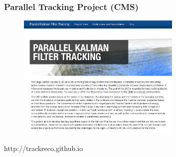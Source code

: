 \begin{frame}
\frametitle{Parallel Tracking Project (CMS)}

\begin{figure}[htbp]
\begin{center}
\includegraphics[width=0.7\textwidth]{images/parallel-trackreco.png}
\end{center}
\end{figure}

\small{http://trackreco.github.io}

\end{frame}



